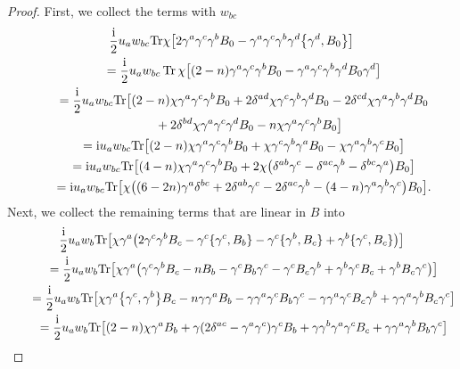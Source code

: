 \documentclass[pdftex]{sigma}
\numberwithin{equation}{section}
\theoremstyle{definition}
\def\Tr{\mathrm{Tr}}
\begin{document}
\begin{proof}
	First, we collect the terms with $w_{bc}$
		\begin{gather*}
			\frac{\rm i}{2}u_aw_{bc}\Tr \chi \bigl[2\gamma^a\gamma^c\gamma^bB_0-\gamma^a\gamma^c\gamma^b\gamma^d\bigl\{\gamma^d,B_0\bigr\}\bigr]\\
			\qquad=\frac{\rm i}{2}u_aw_{bc}\operatorname{Tr} \chi \bigl[(2-n)\gamma^a\gamma^c\gamma^bB_0-\gamma^a\gamma^c\gamma^b\gamma^dB_0\gamma^d\bigr]
			\\
			\qquad=\frac{\rm i}{2}u_aw_{bc}\Tr \bigl[(2-n)\chi \gamma^a\gamma^c\gamma^bB_0
			+ 2\delta^{ad}\chi \gamma^c\gamma^b\gamma^dB_0
			- 2\delta^{cd}\chi \gamma^a\gamma^b\gamma^dB_0\\
		\phantom{\qquad=}{}	+ 2\delta^{bd}\chi \gamma^a\gamma^c\gamma^dB_0
			-n \chi \gamma^a\gamma^c\gamma^bB_0\bigr]
			\\
			\qquad= {\rm i} u_a w_{bc}\Tr \bigl[(2-n) \chi \gamma^a \gamma^c\gamma^b B_0 +\chi \gamma^c \gamma^b \gamma^a B_0-\chi \gamma^a \gamma^b \gamma^c B_0\bigr]\\
			\qquad= {\rm i}u_a w_{bc} \Tr\bigl[(4-n) \chi\gamma^a \gamma^c \gamma^b B_0 +2\chi\bigl(\delta^{ab}\gamma^c -\delta^{ac} \gamma^b -\delta^{bc}\gamma^a\bigr)B_0\bigr]\\
			\qquad= {\rm i}u_a w_{bc}\Tr\bigl[\chi\bigl((6-2n)\gamma^a \delta^{bc}+2\delta^{ab}\gamma^c -2\delta^{ac}\gamma^b-(4-n)\gamma^a\gamma^b \gamma^c \bigr)B_0\bigr].
		\end{gather*}
	Next, we collect the remaining terms that are linear in $B$ into
		\begin{gather*}
			\frac{\rm i}{2}u_a w_{b} \Tr \bigl[
			\chi\gamma^a \bigl(2\gamma^c \gamma^b B_c -\gamma^c\{\gamma^c, B_b\}-\gamma^c \{\gamma^b, B_c\}+\gamma^b \{\gamma^c,B_c\}\bigr) \bigr] \\
			\qquad=\frac{\rm i}{2} u_a w_b \Tr \bigl[
			\chi\gamma^a \bigl(\gamma^c \gamma^b B_c -n B_b -\gamma^c B_b \gamma^c -\gamma^c B_c \gamma^b +\gamma^b \gamma^c B_c +\gamma^b B_c \gamma^c\bigr)
			\bigr] \\
			\qquad=\frac{\rm i}{2}u_a w_b \Tr \bigl[
			\chi\gamma^a \bigl\{\gamma^c,\gamma^b\bigr\} B_c -n\gamma\gamma^a B_b -\gamma\gamma^a \gamma^c B_b \gamma^c -\gamma \gamma^a \gamma^c B_c \gamma^b +\gamma\gamma^a\gamma^b B_c \gamma^c
			\bigr] \\
			\qquad=\frac{\rm i}{2} u_a w_{b}\Tr \bigl[(2-n) \chi\gamma^a B_b +\gamma (2\delta^{ac} -\gamma^a\gamma^c)\gamma^c B_b +\gamma\gamma^b\gamma^a \gamma^c B_c +\gamma\gamma^a\gamma^b B_b \gamma^c\bigr] \\

\end{gather*}
\end{proof}
\end{document}
